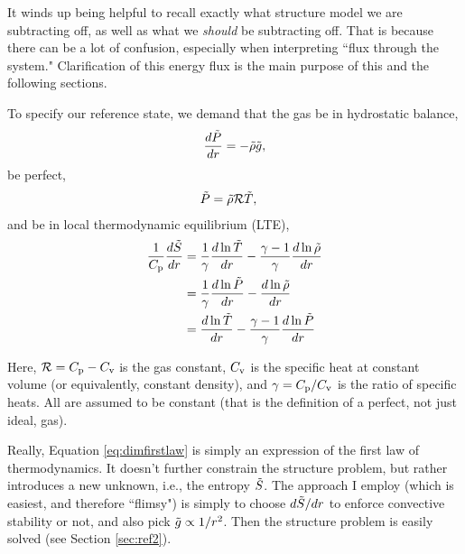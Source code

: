 \documentclass[12pt]{article}
\numberwithin{equation}{section}
\begin{document}
	It winds up being helpful to recall exactly what structure model we are subtracting off, as well as what we \textit{should} be subtracting off. That is because there can be a lot of confusion, especially when interpreting ``flux through the system." Clarification of this energy flux is the main purpose of this and the following sections. 
	
	To specify our reference state, we demand that the gas be in hydrostatic balance,
	\begin{align}\label{eq:dimhydro}
	\frac{d\tilde{P}}{dr}= -\tilde{\rho} \tilde{g},
	\end{align}
	be perfect,
	\begin{align}
	\tilde{P} &= \tilde{\rho}\mathcal{R} \tilde{T},\label{eq:dimidgas}
	\end{align}
	and be in local thermodynamic equilibrium (LTE), 
	\begin{subequations}\label{eq:dimfirstlaw}
	\begin{align}
		\frac{1}{C_{\rm{p}}}\frac{d\tilde{S}}{dr}&=\frac{1}{\gamma}\frac{d\ln\tilde{T}}{dr} - \frac{\gamma - 1}{\gamma}\frac{d\ln\tilde{\rho}}{dr}\label{eq:dimfirstlawtmprho}\\
		&=\frac{1}{\gamma}\frac{d\ln\tilde{P}}{dr} - \frac{d\ln\tilde{\rho}}{dr}\label{eq:dimfirstlawprsrho}\\
		&= \frac{d\ln\tilde{T}}{dr} - \frac{\gamma - 1}{\gamma}\frac{d\ln\tilde{P}}{dr}\label{eq:dimfirstlawtmpprs}
	\end{align}
	\label{eq:firstlaw3}
\end{subequations}

Here, $\mathcal{R}=C_{\rm{p}}-C_{\rm{v}}$ is the gas constant, $C_{\rm{v}}$ is the specific heat at constant volume (or equivalently, constant density), and $\gamma=C_{\rm{p}}/C_{\rm{v}}$ is the ratio of specific heats. All are assumed to be constant (that is the definition of a perfect, not just ideal, gas). 

Really, Equation \eqref{eq:dimfirstlaw} is simply an expression of the first law of thermodynamics. It doesn't further constrain the structure problem, but rather introduces a new unknown, i.e., the entropy $\tilde{S}$. The approach I employ (which is easiest, and therefore ``flimsy") is simply to choose $d\tilde{S}/dr$ to enforce convective stability or not, and also pick $\tilde{g}\propto1/r^2$. Then the structure problem is easily solved (see Section \ref{sec:ref2}). 
\end{document}
